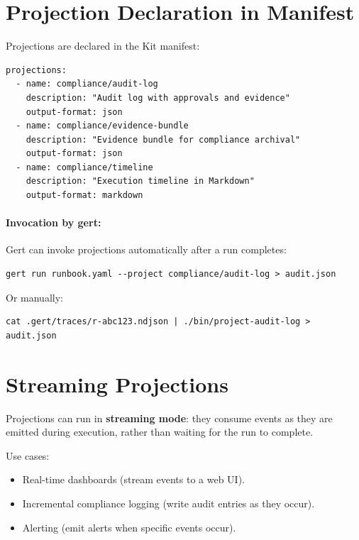 \section{Projection Declaration in Manifest}
\label{sec:projection-manifest}

Projections are declared in the Kit manifest:

\begin{verbatim}
projections:
  - name: compliance/audit-log
    description: "Audit log with approvals and evidence"
    output-format: json
  - name: compliance/evidence-bundle
    description: "Evidence bundle for compliance archival"
    output-format: json
  - name: compliance/timeline
    description: "Execution timeline in Markdown"
    output-format: markdown
\end{verbatim}

\paragraph{Invocation by gert:}

Gert can invoke projections automatically after a run completes:

\begin{verbatim}
gert run runbook.yaml --project compliance/audit-log > audit.json
\end{verbatim}

Or manually:

\begin{verbatim}
cat .gert/traces/r-abc123.ndjson | ./bin/project-audit-log > audit.json
\end{verbatim}

\section{Streaming Projections}
\label{sec:streaming-projections}

Projections can run in \textbf{streaming mode}: they consume events as they are
emitted during execution, rather than waiting for the run to complete.

Use cases:

\begin{itemize}
  \item Real-time dashboards (stream events to a web UI).
  \item Incremental compliance logging (write audit entries as they occur).
  \item Alerting (emit alerts when specific events occur).
\end{itemize}

